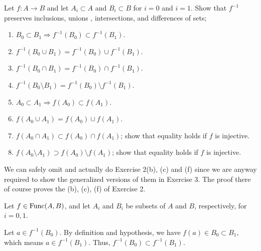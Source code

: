 \documentclass[a4paper,12pt]{article}
\begin{document}
\begin{exe}
	Let \( f:A\to B \) and 
	let \( A_i\subset A \) and \( B_i \subset B \)
	for \( i=0 \) and \( i=1 \).
	Show that \( f ^{-1} \) preserves inclusions, unions , intersections,
	and differences of sets;
	\begin{enumerate}
		\item
		      \( B_0 \subset B_1 \Rightarrow f ^{-1}(B_0) \subset f ^{-1}(B_1) \).
		      
		\item
		      \( f ^{-1}(B_0 \cup B_1) = f ^{-1}(B_0)\cup f ^{-1}(B_1) \).
		      
		\item
		      \( f ^{-1}(B_0 \cap B_1) = f ^{-1}(B_0)\cap f ^{-1}(B_1) \).
		      
		\item
		      \( f ^{-1}(B_0 \setminus B_1) = f ^{-1}(B_0)\setminus f ^{-1}(B_1) \).\leavevmode \par
		      \noindent{}
		      
		\item
		      \( A_0 \subset A_1 \Rightarrow f(A_0) \subset f(A_1) \).
		      
		\item
		      \( f(A_0 \cup A_1) = f(A_0)\cup f(A_1) \).
		      
		\item
		      \( f(A_0 \cap A_1) \subset f(A_0)\cap f(A_1) \);
		      show that equality holds if \( f \) is injective.
		      
		\item
		      \( f(A_0 \setminus A_1) \supset f(A_0)\setminus f(A_1) \);
		      show that equality holds if \( f \) is injective.
	\end{enumerate}
\end{exe}\begin{sol}
	We can safely omit and actually do Exercise 2(b), (c) and (f)
	since we are anyway required to show the generalized versions of them in Exercise 3.
	The proof there of course proves the (b), (c), (f) of Exercise 2.
	
	Let
	\( f \in \mathrm{Func}(A,B) \),
	and let
	\( A_i \)
	and
	\( B_i\)
	be subsets of \( A \)
	and
	\( B\),
	respectively,
	for
	\( i=0,1 \).
	
	Let
	\( a\in f ^{-1}(B_0) \).
	By definition and hypothesis, we have
	\( f(a) \in B_0 \subset B_1\),
	which means
	\( a \in f ^{-1}(B_1) \).
	Thus,
	\( f ^{-1}(B_0) \subset  f ^{-1}(B_1)\).
	

\end{sol}
\end{document}
